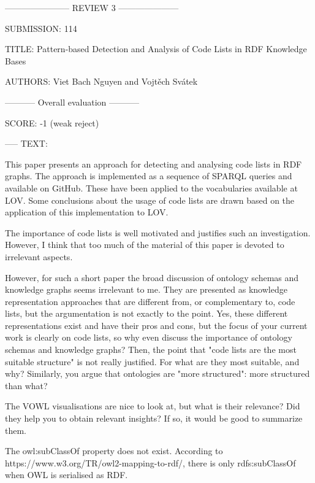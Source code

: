 ----------------------- REVIEW 3 ---------------------

SUBMISSION: 114

TITLE: Pattern-based Detection and Analysis of Code Lists in RDF Knowledge Bases

AUTHORS: Viet Bach Nguyen and Vojtěch Svátek

----------- Overall evaluation -----------

SCORE: -1 (weak reject)

----- TEXT:

This paper presents an approach for detecting and analysing code lists in RDF graphs.  The approach is implemented as a sequence of SPARQL queries and available on GitHub.  These have been applied to the vocabularies available at LOV.  Some conclusions about the usage of code lists are drawn based on the application of this implementation to LOV.

The importance of code lists is well motivated and justifies such an investigation.  However, I think that too much of the material of this paper is devoted to irrelevant aspects.

However, for such a short paper the broad discussion of ontology schemas and knowledge graphs seems irrelevant to me.  They are presented as knowledge representation approaches that are different from, or complementary to, code lists, but the argumentation is not exactly to the point.  Yes, these different representations exist and have their pros and cons, but the focus of your current work is clearly on code lists, so why even discuss the importance of ontology schemas and knowledge graphs?  Then, the point that "code lists are the most suitable structure" is not really justified.  For what are they most suitable, and why?  Similarly, you argue that ontologies are "more structured": more structured than what?

The VOWL visualisations are nice to look at, but what is their relevance?  Did they help you to obtain relevant insights?  If so, it would be good to summarize them.

The owl:subClassOf property does not exist.  According to https://www.w3.org/TR/owl2-mapping-to-rdf/, there is only rdfs:subClassOf when OWL is serialised as RDF.
